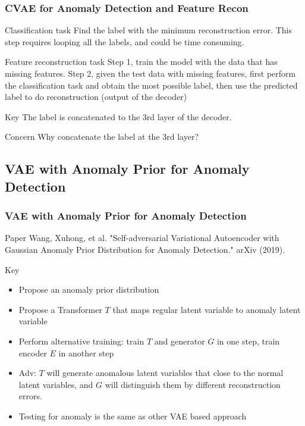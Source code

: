 \documentclass{beamer}
\begin{document}
\begin{frame}
\frametitle{CVAE for Anomaly Detection and Feature Recon}

\begin{block}{Classification task}
Find the label with the minimum reconstruction error.
This step requires looping all the labels, and could be time consuming.
\end{block}

\begin{block}{Feature reconstruction task}
Step 1, train the model with the data that has missing features. Step 2, given the test data with missing features, first perform the classification task and obtain the most possible label, then use the predicted label to do reconstruction (output of the decoder)
\end{block}

\begin{block}{Key}
The label is concatenated to the 3rd layer of the decoder.
\end{block}

\begin{block}{Concern}
Why concatenate the label at the 3rd layer?
\end{block}

\end{frame}


\subsection{VAE with Anomaly Prior for Anomaly Detection}
\begin{frame}
\frametitle{VAE with Anomaly Prior for Anomaly Detection}
\begin{block}{Paper}
Wang, Xuhong, et al. "Self-adversarial Variational Autoencoder with Gaussian Anomaly Prior Distribution for Anomaly Detection." arXiv (2019).
\end{block}

\begin{block}{Key}
\begin{itemize}
\setlength\itemsep{0em}
\item Propose an anomaly prior distribution
\item Propose a Transformer $T$ that maps regular latent variable to anomaly latent variable
\item Perform alternative training: train $T$ and generator $G$ in one step, train encoder $E$ in another step
\item Adv: $T$ will generate anomalous latent variables that close to the normal latent variables, and $G$ will distinguish them by different reconstruction errors.
\item Testing for anomaly is the same as other VAE based approach
\end{itemize}
\end{block}
\end{frame}
\end{document}
